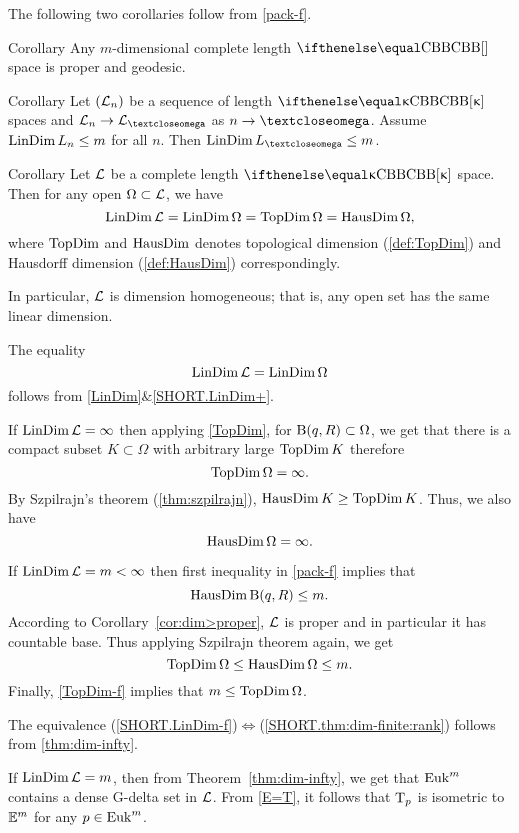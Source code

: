 The following two corollaries follow from \ref{pack-f}.

\begin{thm}{Corollary}\label{cor:dim>proper}
Any $m$-dimensional complete length $\Alex{}$ space is proper and geodesic.
\end{thm}


\begin{thm}{Corollary} Let $(\mathcal{L}_n)$ be a sequence of length $\Alex\kappa$ spaces and $\spc{L}_n\to \spc{L}_\o$ as $n\to\o$.
Assume $\LinDim L_n\le m$ for all $n$.
Then $\LinDim L_\o\le m$.
\end{thm}

\begin{thm}{Corollary}\label{dim=dim} 
Let $\mathcal{L}$ be a complete length $\Alex{\kappa}$ space. 
Then for any open $\Omega\subset \spc{L}$, we have
\[
\mathop{\rm LinDim}\nolimits \mathcal{L}=
\mathop{\rm LinDim}\nolimits\Omega =
\mathop{\rm TopDim}\nolimits\Omega=
\mathop{\rm HausDim}\nolimits\Omega,
\]
where $\mathop{\rm TopDim}\nolimits$ and $\mathop{\rm HausDim}\nolimits$ denotes  topological dimension (\ref{def:TopDim}) and Hausdorff dimension (\ref{def:HausDim}) correspondingly.

In particular, $\mathcal{L}$ is dimension homogeneous; that is, any open set has the same linear dimension.
\end{thm}

The equality
\[\mathop{\rm LinDim}\nolimits \mathcal{L}= \mathop{\rm LinDim}\nolimits\Omega\]
follows from \ref{LinDim}$\&$\ref{SHORT.LinDim+}.

If $\mathop{\rm LinDim}\nolimits \mathcal{L}=\infty$ then
applying  \ref{TopDim}, for $\oBall(q,R)\subset \Omega$, we get that there is a compact subset $K\subset \Omega$ with arbitrary large $\mathop{\rm TopDim}\nolimits K$ therefore
\[\mathop{\rm TopDim}\nolimits\Omega=\infty.\] 
By Szpilrajn's theorem (\ref{thm:szpilrajn}),
$\HausDim K\ge \TopDim K$.
Thus, we also have 
\[\mathop{\rm HausDim}\nolimits\Omega=\infty.\]

If $\mathop{\rm LinDim}\nolimits \mathcal{L}=m<\infty$ then first inequality in \ref{pack-f} 
implies that \[\HausDim \oBall(q,R)\le m.\] 
According to Corollary~\ref{cor:dim>proper}, 
$\mathcal{L}$ is proper and in particular it has countable base. 
Thus applying Szpilrajn theorem  again, we get
\[\TopDim\Omega\le \HausDim \Omega\le m.\]
Finally, \ref{TopDim-f} implies that $m\le\TopDim\Omega$.
\qeds


 The equivalence (\ref{SHORT.LinDim-f})$\Leftrightarrow$(\ref{SHORT.thm:dim-finite:rank}) follows from \ref{thm:dim-infty}.

If $\mathop{\rm LinDim}\nolimits\mathcal{L}=m$, then from Theorem~\ref{thm:dim-infty}, 
we get that $\mathop{\rm Euk}\nolimits^m$ contains a dense G-delta set in $\mathcal{L}$.
From \ref{E=T}, it follows that $\text{\rm T}_p$ is isometric to $\mathbb{E}^m$ for any $p\in \Euk^m$.

